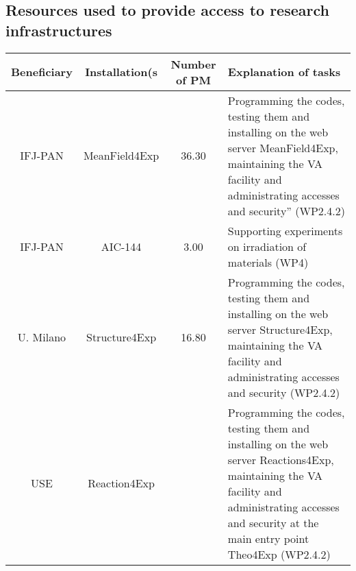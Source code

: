 %
\subsection{Resources used to provide access to research infrastructures}

\begin{table}[H]
\centering
\begin{tabularx}{\textwidth}{|c|c|c|X|} \hline
    \rowcolor{mycyan}
    {\bf Beneficiary} & {\bf Installation(s} & {\bf Number of PM}  & {\bf Explanation of tasks} \\ \hline
    IFJ-PAN & MeanField4Exp & 36.30 & Programming the codes, testing them and installing on the web server MeanField4Exp, maintaining the VA facility and administrating accesses and security” (WP2.4.2)\\ \hline
    IFJ-PAN & AIC-144 & 3.00 & Supporting experiments on irradiation of materials (WP4)\\ \hline
    U. Milano & Structure4Exp & 16.80 & Programming the codes, testing them and installing on the web server Structure4Exp, maintaining the VA facility and administrating accesses and security (WP2.4.2)\\ \hline 
   USE & Reaction4Exp & & Programming the codes, testing them and installing on the web server Reactions4Exp, maintaining the VA facility and administrating accesses and security at the main entry point Theo4Exp (WP2.4.2)\\ \hline 
\end{tabularx}
\label{tab:resources}
\end{table}
